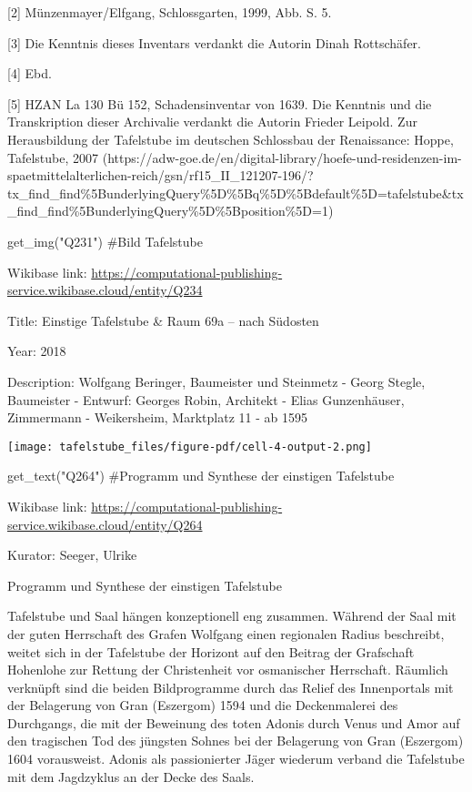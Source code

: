 \documentclass[
  a4paper,
  portrait]{book}
\newenvironment{Shaded}{\begin{snugshade}}{\end{snugshade}}
\newcommand{\CommentTok}[1]{\textcolor[rgb]{0.37,0.37,0.37}{#1}}
\newcommand{\NormalTok}[1]{\textcolor[rgb]{0.00,0.23,0.31}{#1}}
\newcommand{\StringTok}[1]{\textcolor[rgb]{0.13,0.47,0.30}{#1}}
\begin{document}
{[}2{]} Münzenmayer/Elfgang, Schlossgarten, 1999, Abb. S. 5.

{[}3{]} Die Kenntnis dieses Inventars verdankt die Autorin Dinah
Rottschäfer.

{[}4{]} Ebd.

{[}5{]} HZAN La 130 Bü 152, Schadensinventar von 1639. Die Kenntnis und
die Transkription dieser Archivalie verdankt die Autorin Frieder
Leipold. Zur Herausbildung der Tafelstube im deutschen Schlossbau der
Renaissance: Hoppe, Tafelstube, 2007
(https://adw-goe.de/en/digital-library/hoefe-und-residenzen-im-spaetmittelalterlichen-reich/gsn/rf15\_II\_121207-196/?tx\_find\_find\%5BunderlyingQuery\%5D\%5Bq\%5D\%5Bdefault\%5D=tafelstube\&tx\_find\_find\%5BunderlyingQuery\%5D\%5Bposition\%5D=1)

\begin{Shaded}
\begin{Highlighting}[]
\NormalTok{get\_img(}\StringTok{"Q231"}\NormalTok{)}
\CommentTok{\#Bild Tafelstube}
\end{Highlighting}
\end{Shaded}

Wikibase link:
\url{https://computational-publishing-service.wikibase.cloud/entity/Q234}

Title: Einstige Tafelstube \& Raum 69a -- nach Südosten

Year: 2018

Description: Wolfgang Beringer, Baumeister und Steinmetz - Georg Stegle,
Baumeister - Entwurf: Georges Robin, Architekt - Elias Gunzenhäuser,
Zimmermann - Weikersheim, Marktplatz 11 - ab 1595

\texttt{[image: tafelstube\_files/figure-pdf/cell-4-output-2.png]}

\begin{Shaded}
\begin{Highlighting}[]
\NormalTok{get\_text(}\StringTok{"Q264"}\NormalTok{)}
\CommentTok{\#Programm und Synthese der einstigen Tafelstube}
\end{Highlighting}
\end{Shaded}

Wikibase link:
\url{https://computational-publishing-service.wikibase.cloud/entity/Q264}

Kurator: Seeger, Ulrike

Programm und Synthese der einstigen Tafelstube

Tafelstube und Saal hängen konzeptionell eng zusammen. Während der Saal
mit der guten Herrschaft des Grafen Wolfgang einen regionalen Radius
beschreibt, weitet sich in der Tafelstube der Horizont auf den Beitrag
der Grafschaft Hohenlohe zur Rettung der Christenheit vor osmanischer
Herrschaft. Räumlich verknüpft sind die beiden Bildprogramme durch das
Relief des Innenportals mit der Belagerung von Gran (Eszergom) 1594 und
die Deckenmalerei des Durchgangs, die mit der Beweinung des toten Adonis
durch Venus und Amor auf den tragischen Tod des jüngsten Sohnes bei der
Belagerung von Gran (Eszergom) 1604 vorausweist. Adonis als
passionierter Jäger wiederum verband die Tafelstube mit dem Jagdzyklus
an der Decke des Saals.
\end{document}
